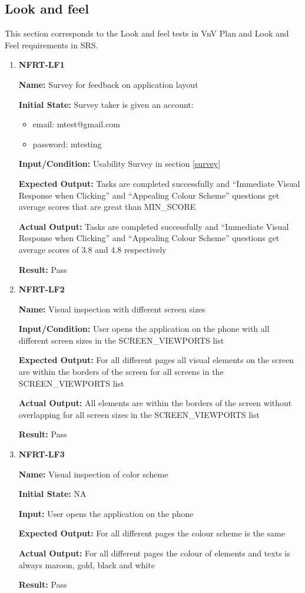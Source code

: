 \documentclass[12pt, titlepage]{article}
\begin{document}
\subsection{Look and feel}
This section corresponds to the Look and feel tests in VnV Plan and Look and Feel requirements in SRS.
\begin{enumerate}
\item \textbf{NFRT-LF1}

\textbf{Name:} Survey for feedback on application layout

\textbf{Initial State:} Survey taker is given an account:
\begin{itemize}
\item email: mtest@gmail.com
\item password: mtesting
\end{itemize}

\textbf{Input/Condition:} Usability Survey in section \ref{survey}

\textbf{Expected Output:} Tasks are completed successfully and ``Immediate Visual Response when Clicking'' and ``Appealing Colour Scheme'' questions get average scores that are great than MIN\_SCORE

\textbf{Actual Output:} Tasks are completed successfully and ``Immediate Visual Response when Clicking'' and ``Appealing Colour Scheme'' questions get average scores of 3.8 and 4.8 respectively

\textbf{Result:} Pass

\item \textbf{NFRT-LF2}

\textbf{Name:} Visual inspection with different screen sizes

\textbf{Input/Condition:} User opens the application on the phone with all different screen sizes in the SCREEN\_VIEWPORTS list

\textbf{Expected Output:} For all different pages all visual elements on the screen are within the borders of the screen for all screens in the SCREEN\_VIEWPORTS list

\textbf{Actual Output:} All elements are within the borders of the screen without overlapping for all screen sizes in the SCREEN\_VIEWPORTS list

\textbf{Result:} Pass

\item \textbf{NFRT-LF3}

\textbf{Name:} Visual inspection of color scheme

\textbf{Initial State:} NA
					
\textbf{Input:} User opens the application on the phone

\textbf{Expected Output:} For all different pages the colour scheme is the same

\textbf{Actual Output:} For all different pages the colour of elements and texts is always maroon, gold, black and white

\textbf{Result:} Pass
\end{enumerate}
\end{document}
